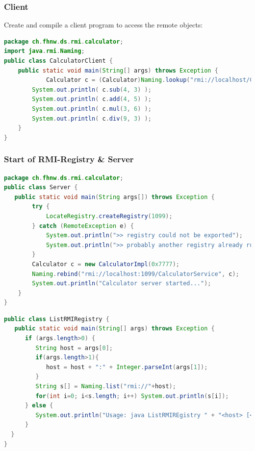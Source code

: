 \documentclass[10pt]{article}
\begin{document}
\subsubsection{Client}
Create and compile a client program to access the remote objects:
\begin{lstlisting}[language=Java, caption=Client, style=JavaStyle]
package ch.fhnw.ds.rmi.calculator;
import java.rmi.Naming;
public class CalculatorClient {
	public static void main(String[] args) throws Exception {
    		Calculator c = (Calculator)Naming.lookup("rmi://localhost/CalculatorService");
		System.out.println( c.sub(4, 3) ); 
		System.out.println( c.add(4, 5) ); 
		System.out.println( c.mul(3, 6) ); 
		System.out.println( c.div(9, 3) );
	}
}
\end{lstlisting}
\subsubsection{Start of RMI-Registry \& Server}
\begin{lstlisting}[language=Java, caption=Example Variant, style=JavaStyle]
package ch.fhnw.ds.rmi.calculator;
public class Server {
   public static void main(String args[]) throws Exception {
		try {
			LocateRegistry.createRegistry(1099);
      	} catch (RemoteException e) {
			System.out.println(">> registry could not be exported");
			System.out.println(">> probably another registry already runs on 1099");
		}
      	Calculator c = new CalculatorImpl(0x7777);
		Naming.rebind("rmi://localhost:1099/CalculatorService", c);
		System.out.println("Calculator server started...");
	}
}
\end{lstlisting}
\begin{lstlisting}[language=Java, caption=List of all registered objects, style=JavaStyle]
public class ListRMIRegistry {
   public static void main(String[] args) throws Exception {
      if (args.length>0) {
         String host = args[0];
         if(args.length>1){
			host = host + ":" + Integer.parseInt(args[1]);
		 }
         String s[] = Naming.list("rmi://"+host);
         for(int i=0; i<s.length; i++) System.out.println(s[i]);
	  } else {
         System.out.println("Usage: java ListRMIREgistry " + "<host> [<port>]");
	  }
  }
}
\end{lstlisting}
\end{document}
